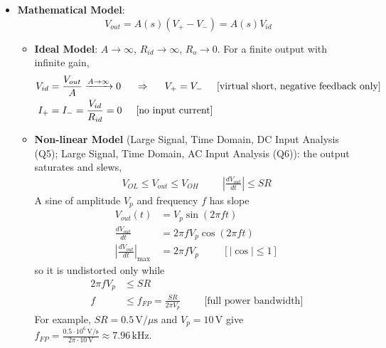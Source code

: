 \begin{itemize}
  \item \textbf{Mathematical Model}:
    \[
      V_{out} = A(s) \left( V_+ - V_- \right) = A(s) V_{id}
    \]
    \begin{itemize}
      \item \textbf{Ideal Model}: \(A \to \infty\), \(R_{id} \to \infty\),
        \(R_o \to 0\). For a finite output with infinite gain,
        \begin{align*}
          V_{id} &= \frac{V_{out}}{A} \xrightarrow{A \to \infty} 0
          \hspace{0.5cm} \Rightarrow \hspace{0.5cm} V_+ = V_- \hspace{0.5cm} \text{[virtual short, negative feedback only]} \\
          I_+ &= I_- = \frac{V_{id}}{R_{id}} = 0 \hspace{0.5cm} \text{[no input current]}
        \end{align*}
      \item \textbf{Non-linear Model} (Large Signal, Time Domain, DC Input Analysis (Q5); Large
        Signal, Time Domain, AC Input Analysis (Q6)): the output saturates and slews,
        \begin{align*}
          V_{OL} \leq V_{out} \leq V_{OH} \hspace{1cm}
          \left|\frac{dV_{out}}{dt}\right| \leq SR
        \end{align*}
        A sine of amplitude \(V_p\) and frequency \(f\) has slope
        \begin{align*}
          V_{out}(t) &= V_p \sin(2\pi f t) \\
          \frac{dV_{out}}{dt} &= 2\pi f V_p \cos(2\pi f t) \\
          \left|\frac{dV_{out}}{dt}\right|_{\max} &= 2\pi f V_p \hspace{1cm} [|\cos| \leq 1]
        \end{align*}
        so it is undistorted only while
        \begin{align*}
          2\pi f V_p &\leq SR \\
          f &\leq f_{FP} = \frac{SR}{2\pi V_p} \hspace{1cm} \text{[full power bandwidth]}
        \end{align*}
        For example, \(SR = 0.5\,\text{V}/\mu\text{s}\) and \(V_p = 10\,\text{V}\) give
        \(f_{FP} = \frac{0.5 \cdot 10^6\,\text{V/s}}{2\pi \cdot 10\,\text{V}} \approx 7.96\,\text{kHz}\).

\end{itemize}
\end{itemize}
